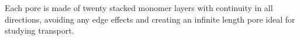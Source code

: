 \documentclass{article}
\begin{document}
	Each pore is made of twenty stacked monomer layers with continuity in all directions, avoiding any edge effects and creating an infinite length pore ideal for studying transport. 
\end{document}
